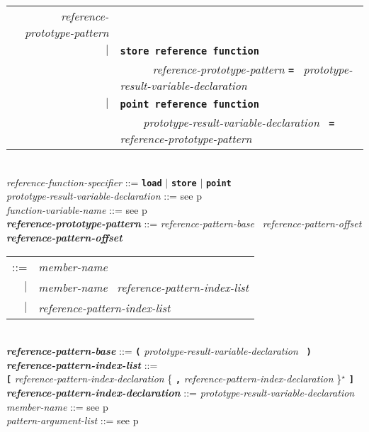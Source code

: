 \documentclass[12pt]{article}
\newcommand{\TT}[1]{{\tt \bfseries #1}}
\newcommand{\STAR}{{\Large $^\star$}}
\newcommand{\ttkey}[1]{{\tt \bfseries #1}}
\newcommand{\emkey}[1]{{\em \bfseries #1}}
\newcommand{\pagref}[1]{p\pageref{#1}}
\newenvironment{indpar}[1][0.3in]%
	{\begin{list}{}%
		     {\setlength{\itemsep}{0in}%
		      \setlength{\topsep}{0in}%
		      \setlength{\parsep}{1ex}%
		      \setlength{\labelwidth}{#1}%
		      \setlength{\leftmargin}{#1}%
		      \addtolength{\leftmargin}{\labelsep}}%
	 \item}%
	{\end{list}}
\begin{document}
\begin{indpar}[0.1in]
\begin{tabular}[t]{rl}
	        {\em reference-prototype-pattern} \\
        $|$ & \ttkey{store reference function} \\
	    & \TT{~~~~}~ {\em reference-prototype-pattern} \TT{=}~
	        {\em prototype-result-variable-declaration} \\
        $|$ & \ttkey{point reference function} \\
	    & \TT{~~~~}{\em prototype-result-variable-declaration}~ \TT{=}~
	        {\em reference-prototype-pattern} \\
    \end{tabular}
\\[0.5ex]
{\em reference-function-specifier} ::=
    \ttkey{load} $|$ \ttkey{store} $|$ \ttkey{point}
\\[0.5ex]
{\em prototype-result-variable-declaration} ::=
    see \pagref{PROTOTYPE-RESULT-VARIABLE-DECLARATION}
\\[0.5ex]
{\em function-variable-name} ::= see \pagref{FUNCTION-VARIABLE-NAME}
\\[0.5ex]
\emkey{reference-prototype-pattern}\label{REFERENCE-PROTOTYPE-PATTERN}
    ::= {\em reference-pattern-base}~ {\em reference-pattern-offset}
\\[0.5ex]
\emkey{reference-pattern-offset}\label{REFERENCE-PATTERN-OFFSET}
    \begin{tabular}[t]{rl}
    ::= & {\em member-name} \\
    $|$ & {\em member-name}~ {\em reference-pattern-index-list} \\
    $|$ & {\em reference-pattern-index-list} \\
    \end{tabular}
\\[0.5ex]
\emkey{reference-pattern-base} ::=
    \TT{(} {\em prototype-result-variable-declaration}~ \TT{)}
\\[0.5ex]
\emkey{reference-pattern-index-list} ::= \\
\hspace*{0.5in}
    \TT{[} {\em reference-pattern-index-declaration}
           \{ \TT{,} {\em reference-pattern-index-declaration} \}\STAR{} \TT{]}
\\[0.5ex]
\emkey{reference-pattern-index-declaration} ::=
    {\em prototype-result-variable-declaration}
\\[0.5ex]
{\em member-name} ::= see \pagref{MEMBER-NAME}
\\[0.5ex]
{\em pattern-argument-list} ::= see \pagref{PATTERN-ARGUMENT-LIST}
\end{indpar}
\end{document}
